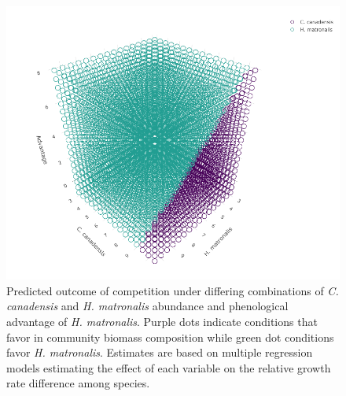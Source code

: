 \documentclass{article}\usepackage[]{graphicx}\usepackage[]{color}
\begin{document}
{\begin{figure}[h!]
    \centering
\includegraphics[width=\textwidth]{..//figure/3dconnolly2.png}
   \caption{Predicted outcome of competition under differing combinations of \textit{C. canadensis} and \textit{H. matronalis} abundance and phenological advantage of \textit{H. matronalis}. Purple dots indicate conditions that favor   in community biomass composition while green dot conditions favor \textit{H. matronalis}. Estimates are based on multiple regression models estimating the effect of each variable on the relative growth rate difference among species.} 
   \label{fig:3D}
\end{figure}

}
\end{document}
